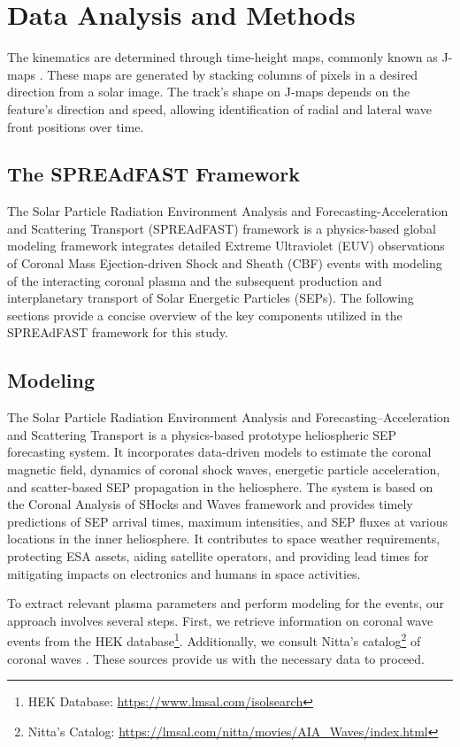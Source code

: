 \section{Data Analysis and Methods}

The kinematics are determined through time-height maps, commonly known as J-maps \citep{sheeley_1999}. These maps are generated by stacking columns of pixels in a desired direction from a solar image. The track's shape on J-maps depends on the feature's direction and speed, allowing identification of radial and lateral wave front positions over time. 


\subsection{The SPREAdFAST Framework}
The Solar Particle Radiation Environment Analysis and Forecasting-Acceleration and Scattering Transport (SPREAdFAST) framework is a physics-based global modeling framework integrates detailed Extreme Ultraviolet (EUV) observations of Coronal Mass Ejection-driven Shock and Sheath (CBF) events with modeling of the interacting coronal plasma and the subsequent production and interplanetary transport of Solar Energetic Particles (SEPs). The following sections provide a concise overview of the key components utilized in the SPREAdFAST framework for this study.

\subsection{Modeling}
The Solar Particle Radiation Environment Analysis and Forecasting–Acceleration and Scattering Transport \citep[SPREAdFAST]{kozarev_2022} is a physics-based prototype heliospheric SEP forecasting system. It incorporates data-driven models to estimate the coronal magnetic field, dynamics of coronal shock waves, energetic particle acceleration, and scatter-based SEP propagation in the heliosphere. The system is based on the Coronal Analysis of SHocks and Waves framework \citep[CASHeW]{kozarev_2017} and provides timely predictions of SEP arrival times, maximum intensities, and SEP fluxes at various locations in the inner heliosphere. It contributes to space weather requirements, protecting ESA assets, aiding satellite operators, and providing lead times for mitigating impacts on electronics and humans in space activities.

To extract relevant plasma parameters and perform modeling for the events, our approach involves several steps. First, we retrieve information on coronal wave events from the HEK database\footnote{HEK Database: \url{https://www.lmsal.com/isolsearch}}. Additionally, we consult Nitta's catalog\footnote{Nitta's Catalog: \url{https://lmsal.com/nitta/movies/AIA_Waves/index.html}} of coronal waves \citep{nitta_2013}. These sources provide us with the necessary data to proceed.

